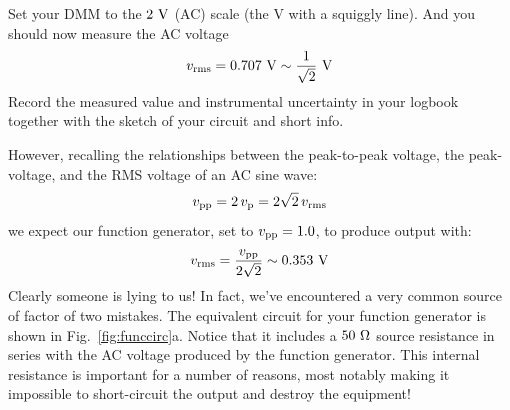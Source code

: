 \begin{measurement} Set your DMM to the $2~\rm V$ (AC) scale (the V with a squiggly line).
And you should now measure the AC voltage 
\begin{displaymath}
v_{\rm rms} = 0.707~\rm V \sim \frac{1}{\sqrt{2}}~\rm V
\end{displaymath} 
Record the measured value and instrumental uncertainty in your logbook together with the sketch of your circuit and short info. 
\end{measurement}
However, recalling the relationships between the peak-to-peak voltage, the peak-voltage, and the RMS voltage of an AC sine wave:
\begin{displaymath}
v_{\rm pp} = 2 \, v_{\rm p} = 2 \sqrt{2} \, v_{\rm rms}
\end{displaymath}
we expect our function generator, set to $v_{\rm pp} = 1.0$, to produce output with:
\begin{displaymath}
v_{\rm rms} = \frac{v_{\rm pp}}{2\sqrt{2}} \sim 0.353~\rm V
\end{displaymath}
Clearly someone is lying to us!  In fact, we've encountered a very
common source of factor of two mistakes.  The equivalent circuit for
your function generator is shown in Fig.~\ref{fig:funccirc}a.  Notice
that it includes a $50~\rm \Omega$ source resistance in series with
the AC voltage produced by the function generator.  This internal
resistance is important for a number of reasons, most notably making
it impossible to short-circuit the output and destroy the
equipment!

